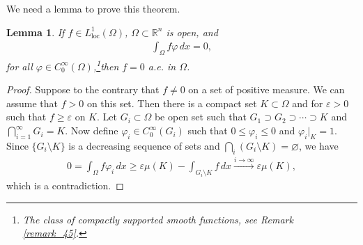 \documentclass[11pt]{book}
\newtheorem{lemma}{Lemma}[chapter]
\theoremstyle{definition}
\numberwithin{equation}{chapter}
\begin{document}
\medskip

We need a lemma to prove this theorem.

\medskip

\begin{lemma}\label{lemma_67}
If $f \in L^1_{\operatorname{loc}}(\Omega)$, $\Omega \subset \mathbb{R}^n$ is open, and
\begin{align*}
    \int_{\Omega} f\varphi \,dx = 0,
\end{align*}
for all $\varphi \in C^\infty_0(\Omega)$,\footnote{The class of compactly supported smooth functions, see Remark \ref{remark_45}.}then $f = 0$ a.e. in $\Omega$.
\end{lemma}
\begin{proof}
Suppose to the contrary that $f \neq 0$ on a set of positive measure. We can assume that $f > 0$ on this set. Then there is a compact set $K \subset \Omega$ and for $\varepsilon > 0$ such that $f \geq \varepsilon$ on $K$. Let $G_i \subset \Omega$ be open set such that $G_1 \supset G_2 \supset \cdots \supset K$ and $\bigcap^\infty_{i=1} G_i = K$. Now define $\varphi_i \in C^\infty_0(G_i)$ such that $0 \leq \varphi_i \leq 0$ and $\varphi_i|_K = 1$. Since $\{G_i \setminus K\}$ is a decreasing sequence of sets and $\bigcap_i(G_i \setminus K) = \varnothing$, we have
\begin{align*}
    0 = \int_\Omega f \varphi_i \,dx \geq \varepsilon \mu(K) - \int_{G_i \setminus K} f \,dx \xrightarrow[]{i\to\infty} \varepsilon \mu(K),
\end{align*}
which is a contradiction.
\end{proof}

\medskip
\end{document}
